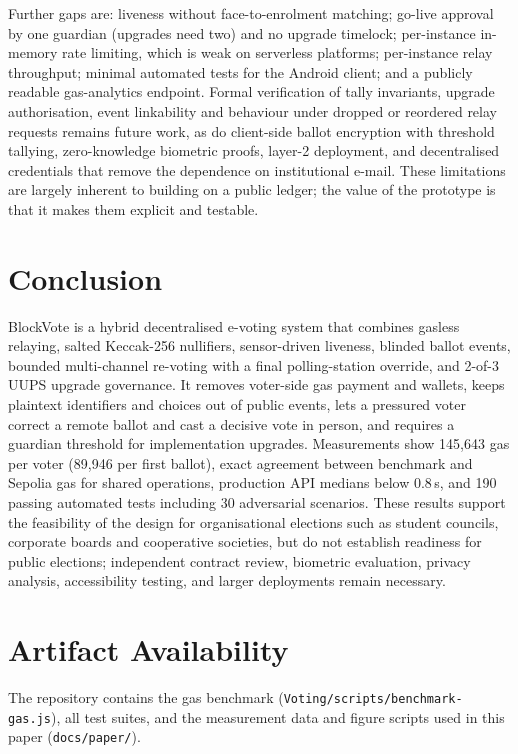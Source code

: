\documentclass[conference]{IEEEtran}
\newcommand{\code}[1]{\texttt{\small #1}}
\begin{document}
Further gaps are: liveness without face-to-enrolment matching; go-live approval by one guardian (upgrades need two) and no upgrade timelock; per-instance in-memory rate limiting, which is weak on serverless platforms; per-instance relay throughput; minimal automated tests for the Android client; and a publicly readable gas-analytics endpoint. Formal verification of tally invariants, upgrade authorisation, event linkability and behaviour under dropped or reordered relay requests remains future work, as do client-side ballot encryption with threshold tallying, zero-knowledge biometric proofs, layer-2 deployment, and decentralised credentials that remove the dependence on institutional e-mail. These limitations are largely inherent to building on a public ledger; the value of the prototype is that it makes them explicit and testable.

\section{Conclusion}
BlockVote is a hybrid decentralised e-voting system that combines gasless relaying, salted Keccak-256 nullifiers, sensor-driven liveness, blinded ballot events, bounded multi-channel re-voting with a final polling-station override, and 2-of-3 UUPS upgrade governance. It removes voter-side gas payment and wallets, keeps plaintext identifiers and choices out of public events, lets a pressured voter correct a remote ballot and cast a decisive vote in person, and requires a guardian threshold for implementation upgrades. Measurements show 145,643 gas per voter (89,946 per first ballot), exact agreement between benchmark and Sepolia gas for shared operations, production API medians below 0.8\,s, and 190 passing automated tests including 30 adversarial scenarios. These results support the feasibility of the design for organisational elections such as student councils, corporate boards and cooperative societies, but do not establish readiness for public elections; independent contract review, biometric evaluation, privacy analysis, accessibility testing, and larger deployments remain necessary.

\section*{Artifact Availability}
The repository contains the gas benchmark (\code{Voting/scripts/benchmark-gas.js}), all test suites, and the measurement data and figure scripts used in this paper (\code{docs/paper/}).
\end{document}
